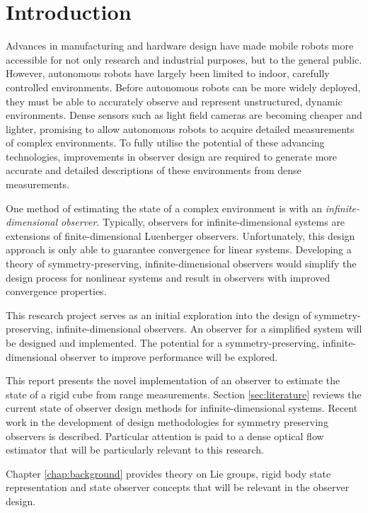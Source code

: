 \chapter{Introduction}

Advances in manufacturing and hardware design have made mobile robots more accessible for not only research and industrial purposes, but to the general public. However, autonomous robots have largely been limited to indoor, carefully controlled environments. Before autonomous robots can be more widely deployed, they must be able to accurately observe and represent unstructured, dynamic environments. Dense sensors such as light field cameras are becoming cheaper and lighter, promising to allow autonomous robots to acquire detailed measurements of complex environments. To fully utilise the potential of these advancing technologies, improvements in observer design are required to generate more accurate and detailed descriptions of these environments from dense measurements.

One method of estimating the state of a complex environment is with an \textit{infinite-dimensional observer}. Typically, observers for infinite-dimensional systems are extensions of finite-dimensional Luenberger observers. Unfortunately, this design approach is only able to guarantee convergence for linear systems. Developing a theory of symmetry-preserving, infinite-dimensional observers would simplify the design process for nonlinear systems and result in observers with improved convergence properties.

This research project serves as an initial exploration into the design of symmetry-preserving, infinite-dimensional observers. An observer for a simplified system will be designed and implemented. The potential for a symmetry-preserving, infinite-dimensional observer to improve performance will be explored. 

This report presents the novel implementation of an observer to estimate the state of a rigid cube from range measurements. Section \ref{sec:literature} reviews the current state of observer design methods for infinite-dimensional systems. Recent work in the development of design methodologies for symmetry preserving observers is described. Particular attention is paid to a dense optical flow estimator that will be particularly relevant to this research.
 
Chapter \ref{chap:background} provides theory on Lie groups, rigid body state representation and state observer concepts that will be relevant in the observer design.


